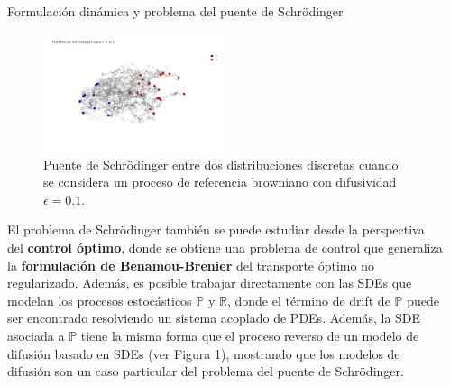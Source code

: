 \documentclass[final]{beamer}
\newlength{\sepwidth}
\newlength{\colwidth}
\newcommand{\separatorcolumn}{\begin{column}{\sepwidth}\end{column}}
\begin{document}
\begin{frame}[t]
\begin{columns}[t]
\begin{column}{\colwidth}
\begin{block}{Formulación dinámica y problema del puente de Schrödinger}
        \begin{figure}
          \centering
          \includegraphics[width=0.49\textwidth]{images/sbp_solution0.1}
          \caption{Puente de Schrödinger entre dos distribuciones discretas cuando se considera un proceso de referencia browniano con difusividad $\epsilon=0.1$.}
        \end{figure}

        El problema de Schrödinger también se puede estudiar desde la perspectiva del \textbf{control óptimo}, donde se obtiene una problema de control que generaliza la \textbf{formulación de Benamou-Brenier} del transporte óptimo no regularizado. Además, es posible trabajar directamente con las SDEs que modelan los procesos estocásticos $\mathbb{P}$ y $\mathbb{R}$, donde el término de drift de $\mathbb{P}$ puede ser encontrado resolviendo un sistema acoplado de PDEs. Además, la SDE asociada a $\mathbb{P}$ tiene la misma forma que el proceso reverso de un modelo de difusión basado en SDEs (ver Figura 1), mostrando que los modelos de difusión son un caso particular del problema del puente de Schrödinger.

      \end{block}

    \end{column}
    \separatorcolumn

  \end{columns}
\end{frame}
\end{document}
